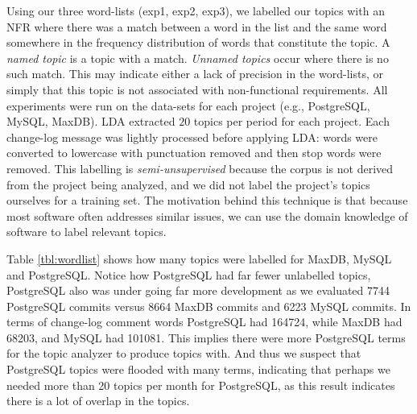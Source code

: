\documentclass[smallextended]{svjour3}       %
\begin{document}
Using our three word-lists (\textsf{exp1}, \textsf{exp2}, \textsf{exp3}), we labelled our topics with an NFR where there was a match between a word in
the list and the same word somewhere in the frequency distribution of words that constitute the topic.
A \emph{named topic} is a topic with a match. 
\emph{Unnamed topics} occur where there is no such match. 
This may indicate either a lack of precision in the word-lists, or simply that this topic is not associated with non-functional
requirements.
All experiments were run on the data-sets for each project (e.g., PostgreSQL, MySQL, MaxDB). LDA
extracted $20$ topics per period for each project.
Each change-log message was lightly processed before applying LDA:
words were converted to lowercase with punctuation removed and then
stop words were removed.
This labelling is \emph{semi-unsupervised} because the corpus is not derived from 
the project being analyzed, and we did not label the project's topics
ourselves for a training set. The motivation behind this technique is that
because most software often addresses similar issues, we can use the 
domain knowledge of software to label relevant topics.


Table \ref{tbl:wordlist} shows how many topics were labelled for
MaxDB, MySQL and PostgreSQL.  Notice how PostgreSQL had far fewer
unlabelled topics, PostgreSQL also was under going far more
development as we evaluated 7744 PostgreSQL commits versus 8664 MaxDB
commits and 6223 MySQL commits. 
In terms of change-log comment words PostgreSQL had 164724, while
MaxDB had 68203, and MySQL had 101081. This implies there were
more PostgreSQL
terms for the topic analyzer to produce topics with.
And thus we suspect that PostgreSQL topics were
flooded with many terms, indicating that perhaps we needed more than 20 topics per month
for PostgreSQL, as this result indicates there is a lot of overlap in
the topics.

\end{document}
